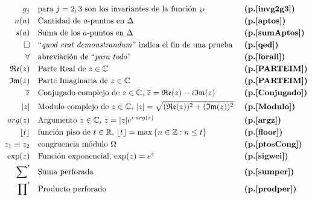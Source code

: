 \documentclass[spanish, openright,oneside]{book}
\theoremstyle{definition}
\begin{document}
\begin{align*}
g_j \ \ \ & \text{para $j=2,3$ son los invariantes de la función $\wp$}   & & \text{\textbf{(p.\pageref{invg2g3})}}\\
n(a) \ \ \ & \text{Cantidad de $a$-puntos en $\Delta$}   & & \text{\textbf{(p.\pageref{aptos})}}\\
s(a) \ \ \ & \text{Suma de los $a$-puntos en $\Delta$}   & & \text{\textbf{(p.\pageref{sumAptos})}}\\
\qed \ \ \ &  \text{``\textit{quod erat demonstrandum}'' indica el fin de una prueba}  & & \text{\textbf{(p.\pageref{qed})}}\\
\forall \ \ \ &  \text{abreviación de ``\textit{para todo}'' }  & & \text{\textbf{(p.\pageref{forall})}}\\
\mathfrak{Re}(z) \ \ \ &  \text{Parte Real de $z \in \mathbb{C}$ }  & & \text{\textbf{(p.\pageref{PARTEIM})}}\\
\mathfrak{Im}(z) \ \ \ &  \text{Parte Imaginaria de $z \in \mathbb{C}$ }  & & \text{\textbf{(p.\pageref{PARTEIM})}}\\
\overline{z} \ \ \ &  \text{Conjugado complejo de $z \in \mathbb{C}$, $\overline{z}=\mathfrak{Re}(z) - i \mathfrak{Im}(z)$ }  & & \text{\textbf{(p.\pageref{Conjugado})}}\\
|z| \ \ \ &  \text{Modulo complejo de $z \in \mathbb{C}$, $|z|=\sqrt{(\mathfrak{Re}(z))^2+(\mathfrak{Im}(z))^2}$ }  & & \text{\textbf{(p.\pageref{Modulo})}}\\
arg(z) \ \ \ &  \text{Argumento $z \in \mathbb{C}$, $z=|z|e^{i\cdot arg(z)}$ }  & & \text{\textbf{(p.\pageref{argz})}}\\
\lfloor t \rfloor \ \ \ &  \text{función piso de $t \in \mathbb{R}$, $\lfloor t \rfloor=\max\left\{n \in \mathbb{Z} : n\leq t \right\}$ }  & & \text{\textbf{(p.\pageref{floor})}}\\
z_1 \equiv z_2 \ \ \ & \text{congruencia módulo $\Omega$}   & & \text{\textbf{(p.\pageref{ptosCong})}}\\
\exp(z) \ \ \ &  \text{Función exponencial, $\exp(z)=e^{z}$ }  & & \text{\textbf{(p.\pageref{sigwei})}}\\
{\sum}'\ \ \ & \text{Suma perforada}   & & \text{\textbf{(p.\pageref{sumper})}}\\
{\prod}'\ \ \ & \text{Producto perforado}   & & \text{\textbf{(p.\pageref{prodper})}}\\
\end{align*}


\cleardoublepage
{} %
\listoffigures %
\end{document}
